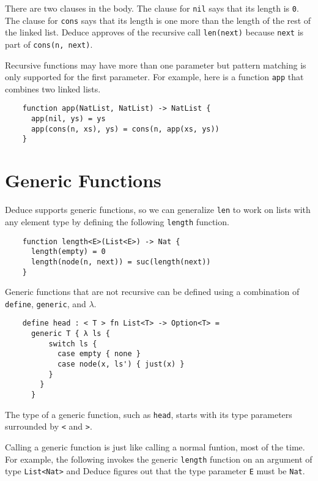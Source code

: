 \documentclass[12pt]{article}
\begin{document}
There are two clauses in the body. The clause for \texttt{nil} says
that its length is \texttt{0}.  The clause for \texttt{cons} says that
its length is one more than the length of the rest of the linked list.
Deduce approves of the recursive call \texttt{len(next)} because
\texttt{next} is part of \texttt{cons(n, next)}.

Recursive functions may have more than one parameter but pattern
matching is only supported for the first parameter. For example, here
is a function \texttt{app} that combines two linked lists.

\begin{verbatim}
    function app(NatList, NatList) -> NatList {
      app(nil, ys) = ys
      app(cons(n, xs), ys) = cons(n, app(xs, ys))
    }
\end{verbatim}

\section{Generic Functions}

Deduce supports generic functions, so we can generalize \texttt{len}
to work on lists with any element type by defining the following
\texttt{length} function.

\begin{verbatim}
    function length<E>(List<E>) -> Nat {
      length(empty) = 0
      length(node(n, next)) = suc(length(next))
    }
\end{verbatim}

Generic functions that are not recursive can be defined using a
combination of \texttt{define}, \texttt{generic}, and $\lambda$.

\begin{verbatim}
    define head : < T > fn List<T> -> Option<T> =
      generic T { λ ls { 
          switch ls {
            case empty { none }
            case node(x, ls') { just(x) }
          }
        }
      }
\end{verbatim}

\noindent The type of a generic function, such as \texttt{head},
starts with its type parameters surrounded by \texttt{<} and \texttt{>}.

Calling a generic function is just like calling a normal funtion, most
of the time. For example, the following invokes the generic
\texttt{length} function on an argument of type \texttt{List<Nat>} and
Deduce figures out that the type parameter \texttt{E} must be
\texttt{Nat}.
\end{document}
